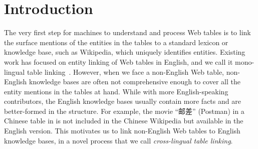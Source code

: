  \section{Introduction}
\label{sec:intro}


The very first step for machines to understand and process Web tables is to
link the surface mentions of the entities in the tables to a standard lexicon or knowledge base,
such as Wikipedia, which uniquely identifies entities. 
Existing work has focused on entity linking of Web tables in English,
and we call it mono-lingual table linking~\cite{bhagavatula2015tabel,wu2016entity}. 
However, when we face a non-English Web table, non-English knowledge bases are often
not comprehensive enough to cover all the entity mentions in the tables at hand.
While with more English-speaking contributors, the English knowledge bases usually contain
more facts and are better-formed in the structure.
For example, the movie ``邮差'' (Postman) in a Chinese table in  is not included in the Chinese Wikipedia
but available in the English version.
This motivates us to link non-English Web tables to English knowledge bases,
in a novel process that we call {\em cross-lingual table linking}.


